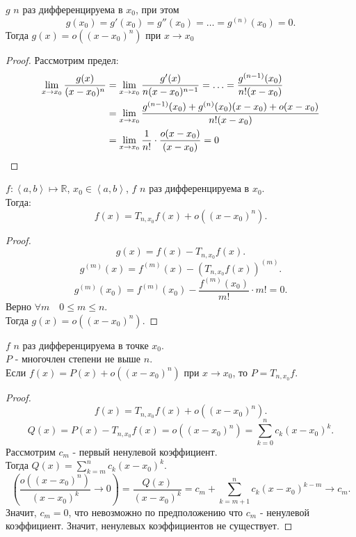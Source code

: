 \documentclass[11pt, oneside]{article}   	%
\begin{document}
    \begin{dlemma}
        $g$  $n$ раз дифференцируема в $x_0$, при этом
        \[ g(x_0) = g'(x_0) = g''(x_0) = \ldots = g^{(n)}(x_0) = 0 .\]
        Тогда $g(x) = o\left( (x-x_0)^{n} \right) $ при $x \to x_0$
        \begin{proof}
            Рассмотрим предел:
            \begin{equation*}
                \begin{split}
                    \lim\limits_{x \to x_0} \frac{g(x)}{(x-x_0)^{n}} &= \lim\limits_{x \to x_0} \frac{g'(x)}{n(x-x_0)^{n-1}} = \ldots = \frac{g^{(n-1)}(x_0)}{n!(x-x_0)}\\
                    &= \lim\limits_{x \to x_0} \frac{g^{(n-1)}(x_0) + g^{(n)}(x_0)(x-x_0) + o(x-x_0)}{n!(x-x_0)}\\
                    &= \lim\limits_{x \to x_0} \frac{1}{n!} \cdot \frac{o(x-x_0)}{(x-x_0)} = 0 \qedhere
                \end{split}
            \end{equation*}
        \end{proof}
    \end{dlemma}
    \begin{theorem}
        $f: \left<a, b\right> \mapsto  \mathbb{R}$, $x_0\in \left<a, b\right>$, $f$  $n$ раз дифференцируема в $x_0$.\\
        Тогда:
        \[ f(x) = T_{n, x_0}f(x) + o((x-x_0)^{n}) .\]
        \begin{proof}
            \[ g(x) = f(x) - T_{n, x_0}f(x) .\]
            \[ g^{(m)}(x) = f^{(m)}(x) - (T_{n, x_0}f(x))^{(m)}.\]
            \[ g^{(m)}(x_0) = f^{(m)}(x_0) - \frac{f^{(m)}(x_0)}{m!} \cdot m! = 0 .\]
            Верно $\forall{m}\quad 0 \le m \le n$.\\
            Тогда $g(x) = o((x-x_0)^{n})$.
        \end{proof}
    \end{theorem}
    \begin{tlemma}
        $f$  $n$ раз дифференцируема в точке $x_0$.\\
        $P$ - многочлен степени не выше $n$.\\
        Если $f(x) = P(x) + o((x-x_0)^{n})$ при $x\to x_0$, то $P = T_{n, x_0}f$.
        \begin{proof}
            \[ f(x) = T_{n, x_0}f(x) + o((x-x_0)^{n}) .\]
            \[ Q(x) = P(x) - T_{n, x_0}f(x) = o((x-x_0)^{n}) = \sum\limits_{k=0}^{n} c_k(x-x_0)^{k}.\]
            Рассмотрим $c_m$ - первый ненулевой коэффициент.\\
            Тогда $Q(x) = \sum\limits_{k=m}^{n}c_k(x-x_0)^{k}$.
            \[ \left(\frac{o((x-x_0)^{n})}{(x-x_0)^{k}} \to 0\right) = \frac{Q(x)}{(x-x_0)^{k}} = c_m + \sum\limits_{k=m+1}^{n}c_k(x-x_0)^{k-m} \to c_m .\]
            Значит, $c_m = 0$, что невозможно по предположению что $c_m$ - ненулевой коэффициент. Значит, ненулевых коэффициентов не существует.
        \end{proof}
    \end{tlemma}
\end{document}
